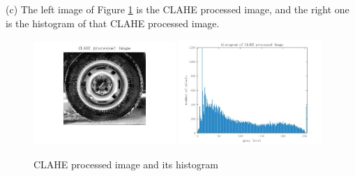 (c) The left image of Figure \ref{fig:p1c} is the CLAHE processed image, and the right one is 
the histogram of that CLAHE processed image.\\

\begin{figure}[htbp]
    \centering
	\includegraphics[width=0.48\textwidth]{../images/p1/p1c_image.jpg}
	\includegraphics[width=0.48\textwidth]{../images/p1/p1c_histogram.jpg}
    \caption{CLAHE processed image and its histogram}
    \label{fig:p1c}
\end{figure}

\newpage
